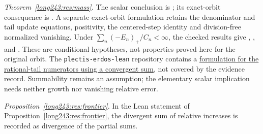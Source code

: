 \documentclass[11pt]{article}
\begin{document}
\noindent\emph{Theorem~\ref{long243:res:mass}.} \noindent The scalar conclusion is
;
its exact-orbit consequence is
.
A separate exact-orbit formulation retains the denominator and tail update
equations, positivity, the centered-step identity and division-free normalized
vanishing. Under $\sum_n(-E_n)_+/C_n<\infty$, the checked results give
,
, and
.
These are conditional hypotheses, not properties proved here for the original
orbit.
The \texttt{plectis-erdos-lean} repository contains a
\href{https://github.com/wcook04/plectis-erdos-lean/blob/52f29ad173b04e3bac941b3663f2b9aebe5de0bb/ErdosProblems/Erdos243/PaperCompleteR8/CanonicalNegativeMass.lean\#L19}{formulation for the rational-tail numerators using a convergent sum},
not covered by the evidence record. Summability remains
an assumption; the elementary scalar implication needs neither growth nor
vanishing relative error.

\noindent\emph{Proposition~\ref{long243:res:frontier}.} \noindent In the Lean statement of Proposition~\ref{long243:res:frontier},
the divergent sum of relative increases is recorded as divergence of the
partial sums.

\iffalse
\end{document}
